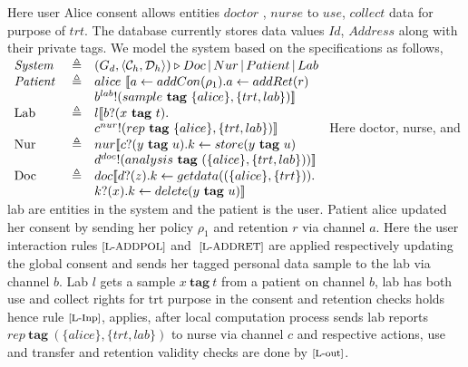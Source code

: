 Here user Alice consent allows entities $ \textit{doctor}$ , $ \textit{nurse}$ to $ \textit{use}$, $ \textit{collect}$ data for purpose of $ \textit{trt}$. The database currently stores data values $ \textit{Id}$, $ \textit{Address}$ along with their private tags.
We model the system based on the specifications as follows,
$\begin{array}{lcl}
\textit{System } & \triangleq &  (G_d , \langle \cons_h, \db _h\rangle ) \triangleright  Doc\, | \, Nur \, | \,  Patient \, | \, Lab \\
\textit{Patient  } & \triangleq & alice \ [\![  a \leftarrow addCon(\rho_1).  a \leftarrow addRet(r) \\
&  &   b^{lab}!(sample \ \textbf{tag} \ {\{alice\}, \{trt,lab\}}) ]\!] \\
\text{Lab }&  \triangleq &  l  [\![  b?(x \ \textbf{tag} \ t ). \\
& &  c^{nur}!(rep \ \textbf{tag} \ {\{alice\}, \{trt,lab\}}) ]\!] \\
 \text{Nur } & \triangleq  & nur [\![  c?(y \ \textbf{tag} \ u ).  k \leftarrow store (y  \ \textbf{tag} \ u)\\
 & & d^{doc}!(analysis \ \textbf{tag} \  ({\{alice\}, \{trt,lab\}})) ]\!]  \\
 \text{Doc  } & \triangleq  & doc [\![  d?(z). k \leftarrow getdata((\{ alice\}, \{trt\})).  \\
 & &  k?(x) .  k \leftarrow delete(y  \ \textbf{tag} \ u) ]\!] \\
\end{array}$
Here doctor, nurse, and lab are entities in the system and the patient is the user. Patient alice updated her consent by sending her policy $ \rho_1$ and retention $r$ via channel $ a $. Here the user interaction rules $ \scriptsize \text{[L-ADDPOL]}$ and $ \scriptsize \text{ [L-ADDRET]}$ are applied respectively updating the global consent and sends her tagged personal data $ \text{sample}$ to the lab via channel $ b$. Lab $ l$ gets a sample $x \ \textbf{tag} \ t $ from a patient on channel $ b$, lab has both use and collect rights for trt purpose in the consent and retention checks holds hence rule $ \scriptsize \text{[L-Inp]}$, applies, after local computation process sends lab reports $rep \ \textbf{tag} \ {(\{alice\}, \{trt,lab\})}$ to nurse via channel $ c$ and respective actions, use and transfer and retention validity checks are done by $ \scriptsize \text{[L-out]} $. 
